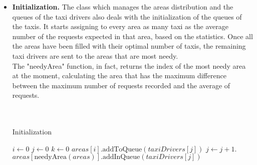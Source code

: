 		\begin{itemize}
			\item \textbf{Initialization.} The class which manages the areas distribution and the queues of the taxi drivers also deals with the initialization of the queues of the taxis. It starts assigning to every area as many taxi as the average number of the requests expected in that area, based on the statistics. Once all the areas have been filled with their optimal number of taxis, the remaining taxi drivers are sent to the areas that are most needy.\\The "needyArea" function, in fact, returns the index of the most needy area at the moment, calculating the area that has the maximum difference between the maximum number of requests recorded and the average of requests.\\
			 \\\\
			
			\begin{algorithm}
				\caption{Initialization}
				\begin{algorithmic}[1]
					\State $i \gets \textit{0}$
					\State $j \gets \textit{0}$
						\State $k \gets \textit{0}$
								\State $areas[i].\text{addToQueue}(taxiDrivers[j])$
								\State $j \gets j+1$.
								\EndFor
						\EndFor
							\State $areas[\text{needyArea} (areas)].\text{addInQueue}(taxiDrivers[j])$
						\EndFor
					\EndIf
					\EndProcedure
				\end{algorithmic}
			\end{algorithm}
			

\end{itemize}
